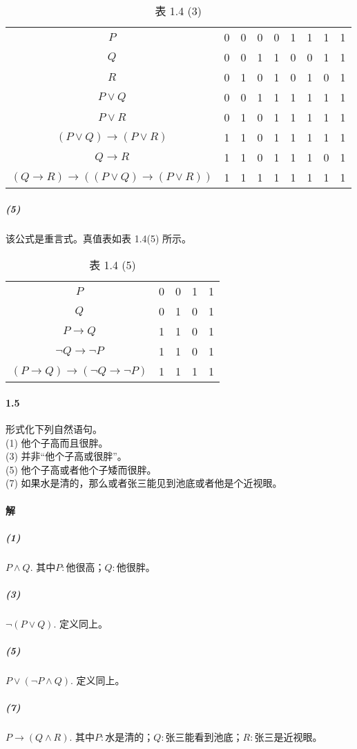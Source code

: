 \documentclass[hyperref, UTF8]{ctexart}
\begin{document}
\begin{table}[!htb]
\centering
\begin{tabular}{ccccccccc}
$P$                                           & 0 & 0 & 0 & 0 & 1 & 1 & 1 & 1 \\
$Q$                                           & 0 & 0 & 1 & 1 & 0 & 0 & 1 & 1 \\
$R$                                           & 0 & 1 & 0 & 1 & 0 & 1 & 0 & 1 \\
$P \lor Q$                                  & 0 & 0 & 1 & 1 & 1 & 1 & 1 & 1 \\
$P \lor R$                                  & 0 & 1 & 0 & 1 & 1 & 1 & 1 & 1 \\
$(P \lor Q) \to (P \lor R)$                 & 1 & 1 & 0 & 1 & 1 & 1 & 1 & 1 \\
$Q \to R$                                   & 1 & 1 & 0 & 1 & 1 & 1 & 0 & 1 \\
$(Q \to R) \to ((P \lor Q) \to (P \lor R))$ & 1 & 1 & 1 & 1 & 1 & 1 & 1 & 1
\end{tabular}
\caption*{表 1.4 (3)}
\end{table}

\subparagraph{(5)} 该公式是重言式。真值表如表 1.4(5) 所示。

\begin{table}[!htb]
\centering
\begin{tabular}{ccccc}
$P$                                   & 0 & 0 & 1 & 1 \\
$Q$                                   & 0 & 1 & 0 & 1 \\
$P \to Q$                             & 1 & 1 & 0 & 1 \\
$\lnot Q \to \lnot P$                 & 1 & 1 & 0 & 1 \\
$(P \to Q) \to (\lnot Q \to \lnot P)$ & 1 & 1 & 1 & 1
\end{tabular}
\caption*{表 1.4 (5)}
\end{table}

\paragraph{1.5}\label{1.5}
形式化下列自然语句。\\

\quad (1) 他个子高而且很胖。 \\

\quad (3) 并非“他个子高或很胖”。\\

\quad (5) 他个子高或者他个子矮而很胖。\\

\quad (7) 如果水是清的，那么或者张三能见到池底或者他是个近视眼。\\

\paragraph{解} 
\subparagraph{(1)}$P\land Q. $ 其中$P: $他很高；$Q: $他很胖。
\subparagraph{(3)}$\lnot (P \lor Q).$ 定义同上。
\subparagraph{(5)}$P \lor (\lnot P \land Q).$ 定义同上。
\subparagraph{(7)}$P\to (Q \land R).$ 其中$P: $水是清的；$Q: $张三能看到池底；$R: $张三是近视眼。
\end{document}
